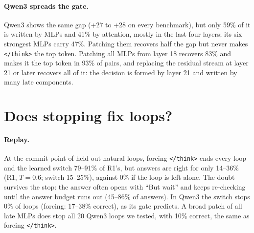 \documentclass[11pt]{article}
\newcommand{\think}{\texttt{</think>}}
\begin{document}
\paragraph{Qwen3 spreads the gate.} Qwen3 shows the same gap (+27 to +28 on every benchmark), but only
59\% of it is written by MLPs and 41\% by attention, mostly in the last four layers; its six strongest MLPs
carry 47\%. Patching them recovers half the gap but never makes \think{} the top token. Patching all
MLPs from layer 18 recovers 83\% and makes it the top token in 93\% of pairs, and replacing the residual
stream at layer 21 or later recovers all of it: the decision is formed by layer 21 and written by many
late components.

\section{Does stopping fix loops?}
\label{sec:fix}

\begin{table}[t]
\centering
\small
\setlength{\tabcolsep}{3pt}
\caption{Live test: accuracy (\%) over fresh runs of the held-out questions (those that loop
naturally) when the stop rule may fire. none = no intervention; force = \think{}; switch = the
benchmark's own learned stop MLPs, set once. 95\% CIs are $\pm$8--10 points ($\pm$12--19 for greedy and
Qwen3 AQuA and GSM8K, which have fewer runs). Sampled GSM8K has too
few held-out questions (R1: 5, Qwen3: 1).}
\label{tab:fix}
\end{table}

\paragraph{Replay.} At the commit point of held-out natural loops, forcing \think{} ends every loop and
the learned switch 79--91\% of R1's, but answers are right for only 14--36\% (R1, $T{=}0.6$; switch
15--25\%), against 0\% if the loop is left alone. The doubt survives the stop: the answer often opens
with ``But wait'' and keeps re-checking until the answer budget runs out (45--86\% of answers). In
Qwen3 the switch stops 0\% of loops (forcing: 17--38\% correct), as its gate predicts. A broad patch of
all late MLPs does stop all 20 Qwen3 loops we tested, with 10\% correct, the same as forcing \think{}.
\end{document}
